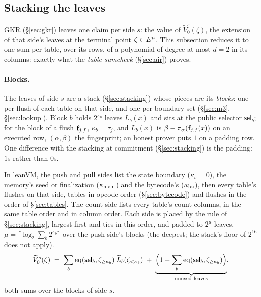\subsection{Stacking the leaves}\label{sec:leafstack}

GKR (\S\ref{sec:gkr}) leaves one claim per side $s$: the value of $\widetilde V^{s}_0(\zeta)$, the extension of that side's leaves at the terminal point $\zeta\in E^{\mu}$. This subsection reduces it to one sum per table, over its rows, of a polynomial of degree at most $d=2$ in its columns: exactly what the \emph{table sumcheck} (\S\ref{sec:air}) proves.

\paragraph{Blocks.} The leaves of side $s$ are a stack (\S\ref{sec:stacking}) whose pieces are its \emph{blocks}: one per flush of each table on that side, and one per boundary set (\S\ref{sec:m3}, \S\ref{sec:lookup}). Block $b$ holds $2^{\kappa_b}$ leaves $L_b(x)$ and sits at the public selector $\mathsf{sel}_b$; for the block of a flush $\mathbf{f}_{j,f}$, $\kappa_b=\tau_j$, and $L_b(x)$ is $\beta-\pi_\alpha(\mathbf{f}_{j,f}(x))$ on an executed row, $(\alpha,\beta)$ the fingerprint; an honest prover puts $1$ on a padding row. One difference with the stacking at commitment (\S\ref{sec:stacking}) is the padding: $1$s rather than $0$s.

In leanVM, the push and pull sides list the state boundary ($\kappa_b=0$), the memory's seed or finalization ($\kappa_{\mathrm{mem}}$) and the bytecode's ($\kappa_{\mathrm{bc}}$), then every table's flushes on that side, tables in opcode order (\S\ref{sec:bytecode}) and flushes in the order of \S\ref{sec:tables}. The count side lists every table's count columns, in the same table order and in column order. Each side is placed by the rule of \S\ref{sec:stacking}, largest first and ties in this order, and padded to $2^{\mu}$ leaves, $\mu=\lceil\log_2\sum_b2^{\kappa_b}\rceil$ over the push side's blocks (the deepest; the stack's floor of $2^{16}$ does not apply).
\begin{equation}\label{eq:gkr_leaves}
  \widetilde V^{s}_0(\zeta)\;=\;\sum_{b}\operatorname{eq}(\mathsf{sel}_b,\zeta_{\ge\kappa_b})\;\widetilde L_b(\zeta_{<\kappa_b})\;+\;\underbrace{\Bigl(1-\sum_{b}\operatorname{eq}(\mathsf{sel}_b,\zeta_{\ge\kappa_b})\Bigr)}_{\text{unused leaves}},
\end{equation}
both sums over the blocks of side $s$.

